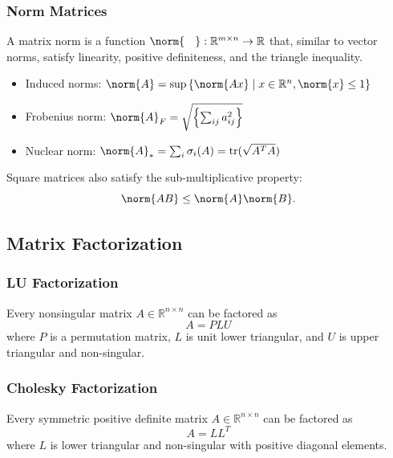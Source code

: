 \documentclass[11pt]{article}
\begin{document}
\subsubsection*{Norm Matrices}
A matrix norm is a function $\norm{\phantom{~.~}}: \mathbb{R}^{m\times n} \rightarrow \mathbb{R}$ that, similar to vector norms, satisfy linearity, positive definiteness, and the triangle inequality. \par
\begin{itemize}
    \item Induced norms: $\norm{A} = \sup \left\{ \norm{Ax} \mid x \in \mathbb{R}^n, \norm{x} \leq 1 \right\}$
    \item Frobenius norm: $\norm{A}_F = \sqrt{\left\{ \sum_{ij} a_{ij}^2 \right\}}$
    \item Nuclear norm: $\norm{A}_* = \sum_i \sigma_i(A) = \mathrm{tr}(\sqrt{A^TA})$  
\end{itemize} 
Square matrices also satisfy the sub-multiplicative property: 
\[ \norm{AB} \leq \norm{A}\norm{B}. \] 

\subsection{Matrix Factorization} 
\subsubsection*{LU Factorization} 
Every nonsingular matrix $A \in \mathbb{R}^{n\times n}$ can be factored as 
\[ A = PLU \] 
where $P$ is a permutation matrix, $L$ is unit lower triangular, and $U$ is upper triangular and non-singular. 
\subsubsection*{Cholesky Factorization} 
Every symmetric positive definite matrix $A \in \mathbb{R}^{n\times n}$ can be factored as 
\[ A = LL^T \] 
where $L$ is lower triangular and non-singular with positive diagonal elements. 
\end{document}
